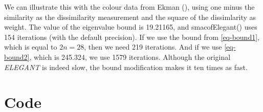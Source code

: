 \documentclass[
  12pt,
  letterpaper,
  DIV=11,
  numbers=noendperiod]{scrartcl}
\newcommand{\sectionbreak}{\clearpage}
\begin{document}
We can illustrate this with the colour data from Ekman
(), using one minus the similarity as the
dissimilarity measurement and the square of the dissimlarity as weight.
The value of the eigenvalue bound is 19.21165, and smacofElegant() uses
154 iterations (with the default precision). If we use the bound from
\eqref{eq-bound1}, which is equal to \(2n=28\), then we need 219
iterations. And if we use \eqref{eq-bound2}, which is 245.324, we use
1579 iterations. Although the original \emph{ELEGANT} is indeed slow,
the bound modification makes it ten times as fast.

\sectionbreak

\section{Code}\label{code}
\end{document}
